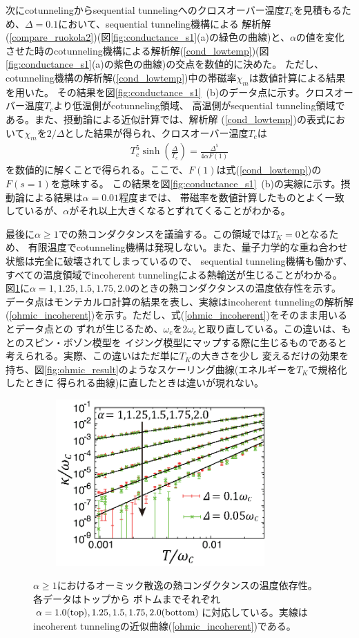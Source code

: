 次にcotunnelingからsequential tunnelingへのクロスオーバー温度$T_c$を見積もるため、$\Delta=0.1$において、sequential tunneling機構による
解析解(\ref{compare_ruokola2})(図\ref{fig:conductance_s1}(a)の緑色の曲線)と、$\alpha$の値を変化させた時のcotunneling機構による解析解(\ref{cond_lowtemp})(図\ref{fig:conductance_s1}(a)の紫色の曲線)の交点を数値的に決めた。
ただし、cotunneling機構の解析解(\ref{cond_lowtemp})中の帯磁率$\chi_m$は数値計算による結果を用いた。
その結果を図\ref{fig:conductance_s1}~(b)のデータ点に示す。クロスオーバー温度$T_c$より低温側がcotunneling領域、
高温側がsequential tunneling領域である。また、摂動論による近似計算では、解析解
(\ref{cond_lowtemp})の表式において$\chi_m$を$2/\Delta$とした結果が得られ、クロスオーバー温度$T_c$は
\begin{eqnarray}
T_c^5\sinh\left(\frac{\Delta}{T_c}\right)= \frac{\Delta^5}{4\alpha F(1)}
\end{eqnarray}
を数値的に解くことで得られる。ここで、$F(1)$は式(\ref{cond_lowtemp})の$F(s=1)$を意味する。
この結果を図\ref{fig:conductance_s1}~(b)の実線に示す。摂動論による結果は$\alpha=0.01$程度までは、
帯磁率を数値計算したものとよく一致しているが、$\alpha$がそれ以上大きくなるとずれてくることがわかる。

最後に$\alpha\geq1$での熱コンダクタンスを議論する。この領域では$T_K=0$となるため、
有限温度でcotunneling機構は発現しない。また、量子力学的な重ね合わせ状態は完全に破壊されてしまっているので、
sequential tunneling機構も働かず、すべての温度領域でincoherent tunnelingによる熱輸送が生じることがわかる。
図\ref{fig:ohmic_incoherent_tunneling}に$\alpha=1, 1.25, 1.5, 1.75, 2.0$のときの熱コンダクタンスの温度依存性を示す。
データ点はモンテカルロ計算の結果を表し、実線はincoherent tunnelingの解析解(\ref{ohmic_incoherent})を示す。ただし、式(\ref{ohmic_incoherent})をそのまま用いるとデータ点との
ずれが生じるため、$\omega_c$を$2\omega_c$と取り直している。この違いは、もとのスピン・ボゾン模型を
イジング模型にマップする際に生じるものであると考えられる。実際、この違いはただ単に$T_K$の大きさを少し
変えるだけの効果を持ち、図\ref{fig:ohmic_result}のようなスケーリング曲線(エネルギーを$T_K$で規格化したときに
得られる曲線)に直したときは違いが現れない。

\begin{figure}[tb]
　\centering
　\includegraphics[width=80mm]{ohmic_incoherent_tunneling.eps}
　\caption{
	$\alpha\geq1$におけるオーミック散逸の熱コンダクタンスの温度依存性。各データはトップから	ボトムまでそれぞれ$\alpha=1.0(\rm top),1.25,1.5,1.75,2.0(\rm bottom)$に対応している。実線は	incoherent tunnelingの近似曲線(\ref{ohmic_incoherent})である。
   }
   \label{fig:ohmic_incoherent_tunneling}
\end{figure}


